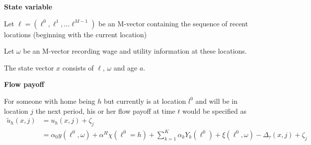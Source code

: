 \documentclass{article}
\numberwithin{equation}{section} %
\begin{document}
\textbf{State variable}

Let $\ell = (\ell^0,\ell^1,...\ell^{M-1})$ be an M-vector containing the sequence of recent locations (beginning  with the current location)

Let $\omega$ be an M-vector recording wage and utility information at these locations. 

The state vector $x$ consists of $\ell$, $\omega$ and age $a$.

\textbf{Flow payoff}

For someone with home being $h$ but currently is at location $l^0$ and will be in location $j$ the next period, his or her flow payoff at time $t$ would be specified as
\begin{equation}
\begin{split}
  \tilde u_h(x,j)&=u_h(x,j)+\zeta_j
  \\& = \alpha_0 y(\ell^0, \omega) + \alpha^H \chi(\ell^0 = h) + \sum_{k=1}^K \alpha_k Y_k(\ell^0) +\xi(\ell^0,\omega)- \Delta_\tau(x, j)+\zeta_j
\end{split}
\label{utility flow kw}
\end{equation}
\end{document}
